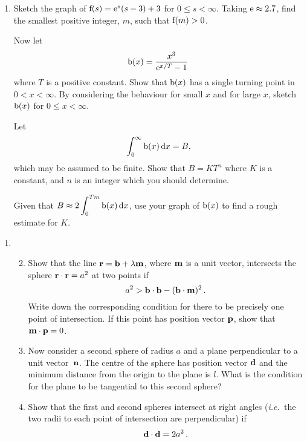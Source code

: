 \documentclass[a4, 11pt]{report}
\newlength{\qspace}
\newcounter{qnumber}
\newenvironment{question}%
 {\vspace{\qspace}
  \begin{enumerate}[\bfseries 1\quad][10]%
    \setcounter{enumi}{\value{qnumber}}%
    \item%
 }
{
  \end{enumerate}
  \filbreak
  \stepcounter{qnumber}
 }
\newenvironment{questionparts}[1][1]%
 {
  \begin{enumerate}[\bfseries (i)]%
    \setcounter{enumii}{#1}
    \addtocounter{enumii}{-1}
    \setlength{\itemsep}{5mm}
    \setlength{\parskip}{8pt}
 }
 {
  \end{enumerate}
 }
\def\d{{\rm d}}
\def\e{{\rm e}}
\def\le{\leqslant}
\begin{document}
\begin{question}
Sketch the graph of ${\rm f}(s)={ \e}^s(s-3)+3$ for $0\le s<\infty$. Taking
${\e\approx 2.7}$, find the smallest positive integer, $m$, such that
${\rm f}(m) >0$.

Now let
$$
{\rm b}(x) = {x^3 \over \e^{x/T} -1} \,
$$
where $T$ is a positive constant. 
Show that ${\rm b}(x)$ has a single turning
point in $0 <x<\infty$. By considering the behaviour for small $x$
and for large $x$, sketch ${\rm b}(x)$ for $0\le x < \infty$.

Let 
$$
 \int_0^\infty {\rm b}(x)\,\d x =B,
$$
which may be assumed to be finite.
Show that $B = K  T^n$ where $K$ is a constant,  and $n$ is an
integer which you should determine.

Given that $\displaystyle{B \approx 2 \int_0^{Tm} {\rm b}(x) {\,\rm d }x}$,   
use your graph of ${\rm b}(x)$ to  find a rough estimate for $K$.
\end{question}
		
\begin{question}	
\begin{questionparts}

\item Show that the line ${\bf r} ={\bf b} + \lambda {\bf m}$,
where $\bf m$ is a unit vector,
intersects the sphere ${\bf r}\cdot {\bf r} = a^2$ at two points if
$$
a^2 > {\bf b}\cdot{\bf b} -({\bf b}\cdot{\bf m})^2 \,.
$$
Write down  the corresponding condition for there to be precisely one
point of intersection.
If this point has position vector ${\bf p}$, show that ${\bf m}\cdot{\bf p}=0$.

\item
Now consider a second sphere of radius $a$
and a plane perpendicular to a unit vector~${\bf n}$.
The centre of the sphere 
has position vector ${\bf d}$
and the 
minimum distance from the origin to the plane is $l$. What is the
condition for the plane to be tangential to this second sphere?

\item
Show that the first and second spheres intersect at right angles 
({\em i.e.\ }the two radii to each point of 
intersection are perpendicular) if
$$
{\bf d}\cdot{\bf d} = 2 a^2 \,.
$$
\end{questionparts}
\end{question}	
		
\end{document}
